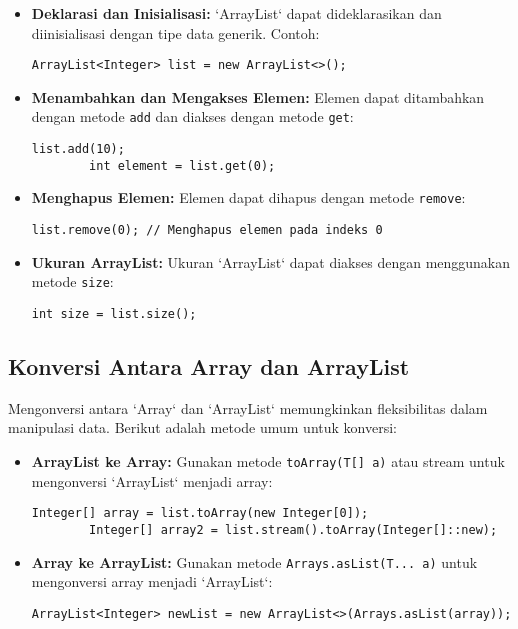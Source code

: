 \begin{itemize}
	\item \textbf{Deklarasi dan Inisialisasi:} `ArrayList` dapat dideklarasikan dan diinisialisasi dengan tipe data generik. Contoh:
	\begin{lstlisting}[style=JavaStyle]
		ArrayList<Integer> list = new ArrayList<>();
	\end{lstlisting}
	\item \textbf{Menambahkan dan Mengakses Elemen:} Elemen dapat ditambahkan dengan metode \texttt{add} dan diakses dengan metode \texttt{get}:
	\begin{lstlisting}[style=JavaStyle]
		list.add(10);
		int element = list.get(0);
	\end{lstlisting}
	\item \textbf{Menghapus Elemen:} Elemen dapat dihapus dengan metode \texttt{remove}:
	\begin{lstlisting}[style=JavaStyle]
		list.remove(0); // Menghapus elemen pada indeks 0
	\end{lstlisting}
	\item \textbf{Ukuran ArrayList:} Ukuran `ArrayList` dapat diakses dengan menggunakan metode \texttt{size}:
	\begin{lstlisting}[style=JavaStyle]
		int size = list.size();
	\end{lstlisting}
\end{itemize}

\subsection{Konversi Antara Array dan ArrayList}

Mengonversi antara `Array` dan `ArrayList` memungkinkan fleksibilitas dalam manipulasi data. Berikut adalah metode umum untuk konversi:

\begin{itemize}
	\item \textbf{ArrayList ke Array:} Gunakan metode \texttt{toArray(T[] a)} atau stream untuk mengonversi `ArrayList` menjadi array:
	\begin{lstlisting}[style=JavaStyle]
		Integer[] array = list.toArray(new Integer[0]);
		Integer[] array2 = list.stream().toArray(Integer[]::new);
	\end{lstlisting}
	\item \textbf{Array ke ArrayList:} Gunakan metode \texttt{Arrays.asList(T... a)} untuk mengonversi array menjadi `ArrayList`:
	\begin{lstlisting}[style=JavaStyle]
		ArrayList<Integer> newList = new ArrayList<>(Arrays.asList(array));
	\end{lstlisting}
\end{itemize}

